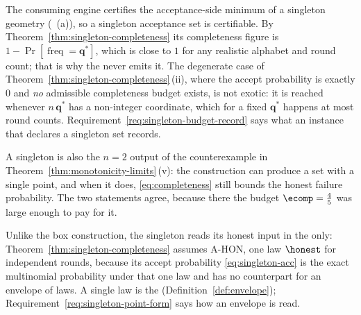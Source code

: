 
\begin{remark}
\label{rem:singleton-honest}
The consuming engine certifies the acceptance-side minimum of a singleton
geometry (~(a)), so a singleton
acceptance set is certifiable. By Theorem~\ref{thm:singleton-completeness}
its completeness figure is $1-\Pr[\operatorname{freq}=\mathbf{q}^{\ast}]$,
which is close to $1$ for any realistic alphabet and round count; that is
why the  never emits it. The degenerate case of
Theorem~\ref{thm:singleton-completeness}\,(ii), where the accept probability is exactly $0$
and \emph{no} admissible completeness budget exists, is not exotic: it is
reached whenever $n\,\mathbf{q}^{\ast}$ has a non-integer coordinate, which
for a fixed $\mathbf{q}^{\ast}$ happens at most round counts.
Requirement~\ref{req:singleton-budget-record} says what an instance that
declares a singleton set records.

A singleton is also the $n=2$ output of the counterexample in
Theorem~\ref{thm:monotonicity-limits}\,(v): the construction can produce a set with a single
point, and when it does, \eqref{eq:completeness} still bounds the honest
failure probability. The two statements agree, because there the budget
$\ecomp=\tfrac45$ was large enough to pay for it.

Unlike the box construction, the singleton reads its honest input in the
 only: Theorem~\ref{thm:singleton-completeness} assumes A-HON, one law
$\honest$ for independent rounds, because its accept probability
\eqref{eq:singleton-acc} is the exact multinomial probability under that one
law and has no counterpart for an envelope of laws. A single law is the
 (Definition~\ref{def:envelope});
Requirement~\ref{req:singleton-point-form} says how an envelope is read.
\end{remark}
